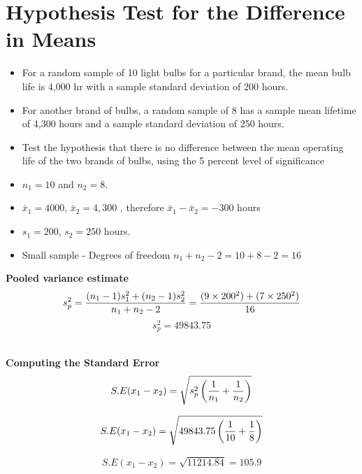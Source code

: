 \documentclass[a4paper,12pt]{article}
\begin{document}
\large 

\section*{Hypothesis Test for the Difference in Means}
\begin{itemize}
\item For a random sample of 10 light bulbs for a particular brand, the mean bulb life is 4,000 hr with a sample standard deviation of 200 hours.
\item For another brand of bulbs, a random sample of 8 has a sample mean lifetime of 4,300 hours
and a sample standard deviation of 250 hours. 
\item Test the hypothesis that there is no difference between the
mean operating life of the two brands of bulbs, using the 5 percent level of significance
\end{itemize}


\medskip

\begin{itemize}\item $n_1 = 10$ and $n_2 = 8$.
\item $\bar{x}_1 = 4000$, $\bar{x}_2 = 4,300 $ , therefore  $\bar{x}_1 - \bar{x}_2 = -300$ hours
\item $s_1  = 200$, $s_2 = 250$ hours.
\item Small sample - Degrees of freedom $n_1 + n_2 - 2 = 10 + 8 - 2 = 16$
\end{itemize}

\medskip

\noindent \textbf{Pooled variance estimate}
\[ s^2_p = {(n_1 - 1)s^2_1  + (n_2 - 1)s^2_ 2\over n_1 + n_2 - 2 } = {(9 \times 200^2 ) +( 7 \times 250^2) \over 16 }  \]
\[ s^2_p  = 49843.75 \]
\\


\medskip

\noindent \textbf{Computing the Standard Error}
\[ S.E(x_1 - x_2) = \sqrt{s^2_p \left({1\over n_1}+{1\over n_2} \right)}\]

\[ S.E(x_1 - x_2) = \sqrt{49843.75 \left({1\over 10}+{1\over 8} \right)}\]

\[ S.E(x_1 - x_2) = \sqrt{11214.84} = 105.9\]
\end{document}
